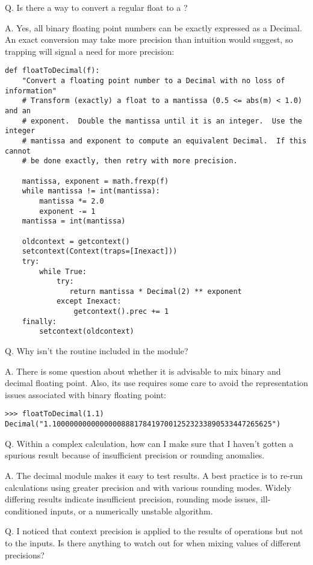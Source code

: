 Q.  Is there a way to convert a regular float to a ?

A.  Yes, all binary floating point numbers can be exactly expressed as a
Decimal.  An exact conversion may take more precision than intuition would
suggest, so trapping  will signal a need for more precision:

\begin{verbatim}
def floatToDecimal(f):
    "Convert a floating point number to a Decimal with no loss of information"
    # Transform (exactly) a float to a mantissa (0.5 <= abs(m) < 1.0) and an
    # exponent.  Double the mantissa until it is an integer.  Use the integer
    # mantissa and exponent to compute an equivalent Decimal.  If this cannot
    # be done exactly, then retry with more precision.

    mantissa, exponent = math.frexp(f)
    while mantissa != int(mantissa):
        mantissa *= 2.0
        exponent -= 1
    mantissa = int(mantissa)

    oldcontext = getcontext()
    setcontext(Context(traps=[Inexact]))
    try:
        while True:
            try:
               return mantissa * Decimal(2) ** exponent
            except Inexact:
                getcontext().prec += 1
    finally:
        setcontext(oldcontext)
\end{verbatim}


Q.  Why isn't the  routine included in the module?

A.  There is some question about whether it is advisable to mix binary and
decimal floating point.  Also, its use requires some care to avoid the
representation issues associated with binary floating point:

\begin{verbatim}
>>> floatToDecimal(1.1)
Decimal("1.100000000000000088817841970012523233890533447265625")
\end{verbatim}


Q.  Within a complex calculation, how can I make sure that I haven't gotten a
spurious result because of insufficient precision or rounding anomalies.

A.  The decimal module makes it easy to test results.  A best practice is to
re-run calculations using greater precision and with various rounding modes.
Widely differing results indicate insufficient precision, rounding mode
issues, ill-conditioned inputs, or a numerically unstable algorithm.


Q.  I noticed that context precision is applied to the results of operations
but not to the inputs.  Is there anything to watch out for when mixing
values of different precisions?

